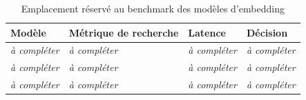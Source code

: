 \begin{table}[H]
\centering
\caption{Emplacement réservé au benchmark des modèles d'embedding}
\small
\setlength{\tabcolsep}{3pt}
\begin{tabular}{p{}p{}p{}p{}}
\toprule
\textbf{Modèle} & \textbf{Métrique de recherche} & \textbf{Latence} & \textbf{Décision} \\
\midrule
\textit{à compléter} & \textit{à compléter} & \textit{à compléter} & \textit{à compléter} \\
\textit{à compléter} & \textit{à compléter} & \textit{à compléter} & \textit{à compléter} \\
\textit{à compléter} & \textit{à compléter} & \textit{à compléter} & \textit{à compléter} \\
\bottomrule
\end{tabular}
\end{table}
